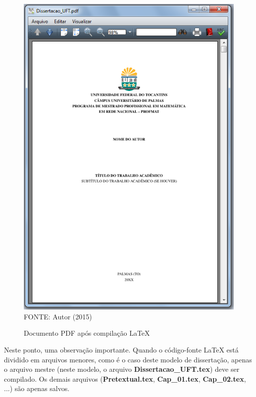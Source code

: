 	\begin{figure}[H]
	\centering
	\caption{Documento PDF após compilação LaTeX}
	\includegraphics[scale=0.7]
	{img/fig18.png}\label{fig18}\\
	FONTE: Autor (2015)
	\end{figure}
	Neste ponto, uma observação importante. Quando o código-fonte LaTeX está dividido em arquivos menores, como é o caso deste modelo de dissertação, apenas o arquivo mestre (neste modelo, o arquivo \textbf{Dissertacao\_UFT.tex}) deve ser compilado. Os demais arquivos (\textbf{Pretextual.tex}, \textbf{Cap\_01.tex}, \textbf{Cap\_02.tex}, ...) são apenas salvos.
	
